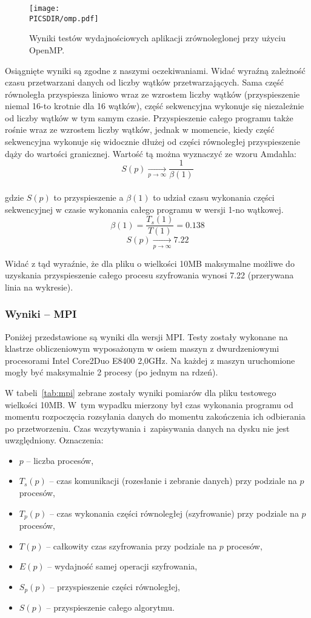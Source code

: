 \documentclass[a4paper,12pt]{article}
\def\PICSDIR{PICS}
\begin{document}
\begin{figure}[h!]
\centering
\texttt{[image: \\PICSDIR/omp.pdf]}
\caption{Wyniki testów wydajnościowych aplikacji zrównoleglonej przy użyciu OpenMP.}
\label{rys:res_omp}
\end{figure}

Osiągnięte wyniki są zgodne z naszymi oczekiwaniami. Widać wyraźną
zależność czasu przetwarzani danych od liczby wątków przetwarzających. Sama część
równoległa przyspiesza liniowo wraz ze wzrostem liczby wątków (przyspieszenie niemal 
16-to krotnie dla 16 wątków), część sekwencyjna wykonuje się niezależnie od liczby
wątków w tym samym czasie. Przyspieszenie całego programu także rośnie wraz ze wzrostem liczby
wątków, jednak w momencie, kiedy część sekwencyjna wykonuje się widocznie dłużej od części 
równoległej przyspieszenie dąży do wartości granicznej. Wartość tą można wyznaczyć
ze wzoru Amdahla:\\
$$ S(p) \xrightarrow[p \rightarrow \infty]{} \frac{1}{\beta(1)} $$ \\
gdzie $S(p)$ to przyspieszenie a $\beta(1)$ to udział czasu wykonania części sekwencyjnej 
w czasie wykonania całego programu w wersji 1-no wątkowej.
$$\beta(1)=\frac{T_s(1)}{T(1)}=0.138$$
$$S(p)\xrightarrow[p \rightarrow \infty]{} 7.22$$

Widać z tąd wyraźnie, że dla pliku o wielkości 10MB maksymalne możliwe do uzyskania
przyspieszenie całego procesu szyfrowania wynosi 7.22 (przerywana linia na wykresie).

\subsubsection{Wyniki -- MPI}

Poniżej przedstawione są wyniki dla wersji MPI. Testy zostały wykonane na klastrze obliczeniowym
wyposażonym w osiem maszyn z dwurdzeniowymi procesorami Intel Core2Duo E8400 2,0GHz.
Na każdej z maszyn uruchomione mogły być maksymalnie 2 procesy (po jednym na rdzeń).

W tabeli~\ref{tab:mpi}
zebrane zostały wyniki pomiarów dla pliku testowego wielkości 10MB. W~tym wypadku
mierzony był czas wykonania programu od momentu rozpoczęcia rozsyłania danych do
momentu zakończenia ich odbierania po przetworzeniu. Czas wczytywania i~zapisywania
danych na dysku nie jest uwzględniony. Oznaczenia:
\begin{itemize}
\item $p$ -- liczba procesów,
\item $T_s(p)$ -- czas komunikacji (rozesłanie i zebranie danych) przy podziale na $p$ procesów,
\item $T_p(p)$ -- czas wykonania części równoległej (szyfrowanie) przy podziale na $p$ procesów,
\item $T(p)$ -- całkowity czas szyfrowania przy podziale na $p$ procesów,
\item $E(p)$ -- wydajność samej operacji szyfrowania,
\item $S_p(p)$ -- przyspieszenie części równoległej,
\item $S(p)$ -- przyspieszenie całego algorytmu.
\end{itemize}
\end{document}
